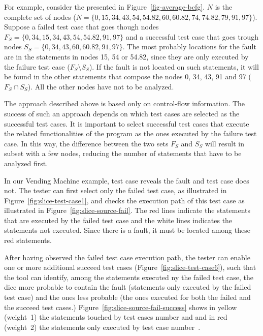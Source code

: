 For example, consider the \BG presented in
Figure~\ref{fig-average-bcfg}. $N$ is the complete set of \BG
nodes ($N = \{0, 15, 34, 43, 54, 54.82, 60, 60.82, 74, 74.82, 79,
91, 97\}$). Suppose a failed test case that goes though \BG nodes
$F_S = \{0, 34, 15, 34, 43, 54, 54.82, 91, 97\}$ and a successful
test case that goes trough \BG nodes $S_S = \{0, 34, 43, 60,
60.82, 91, 97\}$. The most probably locations for the fault are in
the statements in nodes 15, 54 or 54.82, since they are only
executed by the failure test case ($F_S \setminus S_S$). If the
fault is not located on such statements, it will be found in the
other statements that compose the \BG nodes 0, 34, 43, 91 and 97
($F_S \cap S_S$). All the other \BG nodes have not to be analyzed.

The approach described above is based only on control-flow
information. The success of such an approach depends on which test
cases are selected as the successful test cases. It is important
to select successful test cases that execute the related
functionalities of the program as the ones executed by the failure
test case. In this way, the difference between the two sets $F_S$
and $S_S$ will result in subset with a few \BG nodes, reducing the
number of statements that have to be analyzed first.

In our Vending Machine example, test case  reveals the
fault and test case  does not. The tester can first
select only the failed test case, as illustrated in
Figure~\ref{fig:slice-test-case1}, and checks the execution path
of this test case as illustrated in
Figure~\ref{fig:slice-source-fail}. The red lines indicate the
statements that are executed by the failed test case and the white
lines indicates the statements not executed. Since there is a
fault, it must be located among these red statements.



After having observed the failed test case execution path, the
tester can enable one or more additional succeed test cases
(Figure~\ref{fig:slice-test-case6}), such that the tool can
identify, among the statements executed ny the failed test case,
the dice more probable to contain the fault (statements only
executed by the failed test case) and the ones less probable (the
ones executed for both the failed and the succeed test cases.)
Figure~\ref{fig:slice-source-fail-success} shows in yellow
(weight~1) the statements touched by test cases number 
and  and in red (weight~2) the statements only executed
by test case number~.

